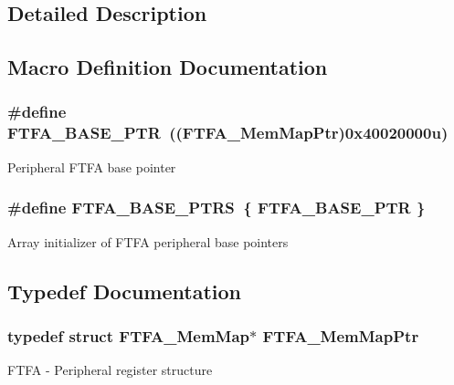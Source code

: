 \subsection{Detailed Description}


\subsection{Macro Definition Documentation}
\hypertarget{group___f_t_f_a___peripheral_ga13ad52f12d5b04e5e01f69ab18ed9216}{}
\subsubsection[{F\+T\+F\+A\+\_\+\+B\+A\+S\+E\+\_\+\+P\+T\+R}]{\setlength{\rightskip}{0pt plus 5cm}\#define F\+T\+F\+A\+\_\+\+B\+A\+S\+E\+\_\+\+P\+T\+R~(({\bf F\+T\+F\+A\+\_\+\+Mem\+Map\+Ptr})0x40020000u)}\label{group___f_t_f_a___peripheral_ga13ad52f12d5b04e5e01f69ab18ed9216}
Peripheral F\+T\+F\+A base pointer \hypertarget{group___f_t_f_a___peripheral_ga3f06770a713a2c02c4eec6b98daefd7e}{}
\subsubsection[{F\+T\+F\+A\+\_\+\+B\+A\+S\+E\+\_\+\+P\+T\+R\+S}]{\setlength{\rightskip}{0pt plus 5cm}\#define F\+T\+F\+A\+\_\+\+B\+A\+S\+E\+\_\+\+P\+T\+R\+S~\{ {\bf F\+T\+F\+A\+\_\+\+B\+A\+S\+E\+\_\+\+P\+T\+R} \}}\label{group___f_t_f_a___peripheral_ga3f06770a713a2c02c4eec6b98daefd7e}
Array initializer of F\+T\+F\+A peripheral base pointers 

\subsection{Typedef Documentation}
\hypertarget{group___f_t_f_a___peripheral_ga49d048bbeb55a090a5ecfe86ff767884}{}
\subsubsection[{F\+T\+F\+A\+\_\+\+Mem\+Map\+Ptr}]{\setlength{\rightskip}{0pt plus 5cm}typedef struct {\bf F\+T\+F\+A\+\_\+\+Mem\+Map}$\ast$ {\bf F\+T\+F\+A\+\_\+\+Mem\+Map\+Ptr}}\label{group___f_t_f_a___peripheral_ga49d048bbeb55a090a5ecfe86ff767884}
F\+T\+F\+A -\/ Peripheral register structure 